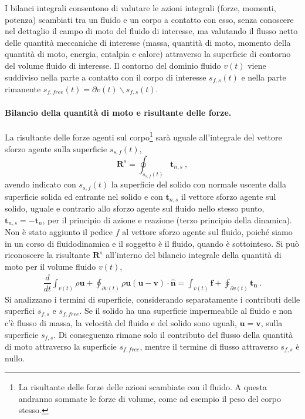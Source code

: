 
I bilanci integrali consentono di valutare le azioni integrali (forze, momenti, potenza) scambiati tra un fluido e un corpo a contatto con esso, senza conoscere nel dettaglio il campo di moto del fluido di interesse, ma valutando il flusso netto delle quantità meccaniche di interesse (massa, quantità di moto, momento della quantità di moto, energia, entalpia e calore) attraverso la superficie di contorno del volume fluido di interesse.
%
Il contorno del dominio fluido $v(t)$ viene suddiviso nella parte a contatto con il corpo di interesse $s_{f,s}(t)$ e nella parte rimanente $s_{f,free}(t) = \partial v(t) \backslash s_{f,s}(t)$.

\paragraph{Bilancio della quantità di moto e risultante delle forze.}
La risultante delle forze agenti sul corpo\footnote{La risultante delle forze delle azioni scambiate con il fluido. A questa andranno sommate le forze di volume, come ad esempio il peso del corpo stesso.} sarà uguale all'integrale del vettore sforzo agente sulla superficie $s_{s,f}(t)$,
\begin{equation}
 \bm{R}^s = \oint_{s_{s,f}(t)} \bm{t}_{n,s} \ ,
\end{equation}
avendo indicato con $s_{s,f}(t)$ la superficie del solido con normale uscente dalla superficie solida ed entrante nel solido e con $\bm{t}_{n,s}$ il vettore sforzo agente sul solido, uguale e contrario allo sforzo agente sul fluido nello stesso punto, $\bm{t}_{n,s} = - \bm{t}_n$, per il principio di azione e reazione (terzo principio della dinamica). Non è stato aggiunto il pedice $f$ al vettore sforzo agente sul fluido, poiché siamo in un corso di fluidodinamica e il soggetto è il fluido, quando è sottointeso.
Si può riconoscere la risultante $\bm{R}^s$ all'interno del bilancio integrale della quantità di moto per il volume fluido $v(t)$,
\begin{equation}
\begin{aligned}
 \dfrac{d}{dt} \displaystyle\int_{v(t)} \rho \bm{u} + \oint_{\partial v(t)} \rho \bm{u} (\bm{u}-\bm{v}) \cdot \bm{\hat{n}}= \int_{v(t)} \bm{f} + \oint_{\partial v(t)} \bm{t_n} \ .
\end{aligned}
\end{equation}
Si analizzano i termini di superficie, considerando separatamente i contributi delle superfici $s_{f,s}$ e $s_{f,free}$. Se il solido ha una superficie impermeabile al fluido e non c'è flusso di massa, la velocità del fluido e del solido sono uguali, $\bm{u} = \bm{v}$, sulla superficie $s_{f,s}$. Di conseguenza rimane solo il contributo del flusso della quantità di moto attraverso la superficie $s_{f,free}$, mentre il termine di flusso attraverso $s_{f,s}$ è nullo.
